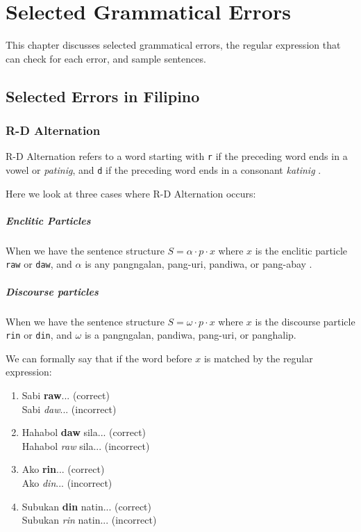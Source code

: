 \chapter{Selected Grammatical Errors}
\label{errors}

This chapter discusses selected grammatical errors, the regular expression that can check for each error, and sample sentences.

\section{Selected Errors in Filipino}
\subsection{R-D Alternation}
\label{rd_alternation}

R-D Alternation refers to a word starting with \texttt{r} if the preceding word ends in a vowel or \textit{patinig}, and \texttt{d} if the preceding word ends in a consonant \textit{katinig} \cite{KWF, OOP}. 

Here we look at three cases where R-D Alternation occurs:

\paragraph{Enclitic Particles} When we have the sentence structure \(S = \alpha \cdot p \cdot x\) where $x$ is the enclitic particle \texttt{raw} or \texttt{daw}, and \(\alpha\) is any pangngalan, pang-uri, pandiwa, or pang-abay \cite{KWF}. 

\paragraph{Discourse particles} When we have the sentence structure $S = \omega \cdot p \cdot x$ where $x$ is the discourse particle \texttt{rin} or \texttt{din}, and $\omega$ is a pangngalan, pandiwa, pang-uri, or panghalip.

We can formally say that if the word before $x$ is matched by the regular expression:

\begin{example}
\end{example}

\begin{enumerate}
    \item Sabi \textbf{raw}... (correct)
        \\ Sabi \textit{daw}... (incorrect)
    \item Hahabol \textbf{daw} sila... (correct)
        \\ Hahabol \textit{raw} sila... (incorrect)
    \item Ako \textbf{rin}... (correct)
        \\ Ako \textit{din}... (incorrect)
    \item Subukan \textbf{din} natin... (correct)
        \\ Subukan \textit{rin} natin... (incorrect)
\end{enumerate}

